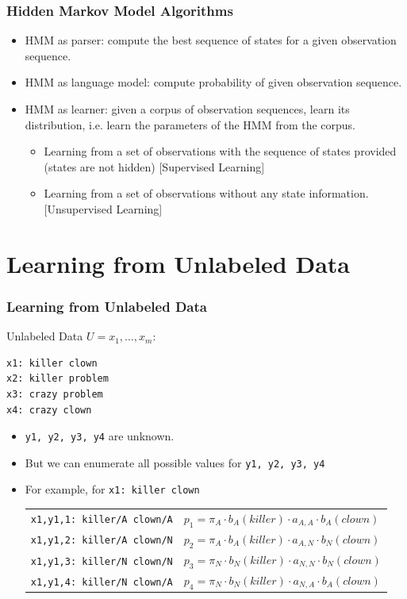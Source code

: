 \begin{frame}
\frametitle{Hidden Markov Model Algorithms}
\begin{itemize}
\item HMM as parser: compute the best sequence of states for a given observation sequence.
\item HMM as language model: compute probability of given observation sequence.
\item HMM as learner: given a corpus of observation sequences, learn its distribution, i.e. learn the parameters of the HMM from the corpus.
\begin{itemize}
\item Learning from a set of observations with the sequence of states provided (states are not hidden) {\color{blue} [Supervised Learning]}
\item Learning from a set of observations without any state information. {\color{blue} [Unsupervised Learning]}
\end{itemize}
\end{itemize}
\end{frame}

\section{Learning from Unlabeled Data}

\begin{frame}[fragile]
\frametitle{Learning from Unlabeled Data}
\begin{block}{Unlabeled Data $U = x_1, \ldots, x_m$:}
\begin{verbatim}
x1: killer clown
x2: killer problem
x3: crazy problem
x4: crazy clown
\end{verbatim}
\end{block}

\begin{itemize}[<+->]
\item {\tt y1, y2, y3, y4} are unknown.
\item But we can enumerate all possible values for {\tt y1, y2, y3, y4}
\item For example, for {\tt x1: killer clown}
{\small\begin{tabular}{ll}
\pause
{\tt x1,y1,1: killer/A clown/A} & $p_1 = \pi_A \cdot b_A(\textit{killer}) \cdot a_{A,A} \cdot b_A(\textit{clown})$ \\
\pause
{\tt x1,y1,2: killer/A clown/N} & $p_2 = \pi_A \cdot b_A(\textit{killer}) \cdot a_{A,N} \cdot b_N(\textit{clown})$\\
\pause
{\tt x1,y1,3: killer/N clown/N} & $p_3 = \pi_N \cdot b_N(\textit{killer}) \cdot a_{N,N} \cdot b_N(\textit{clown})$\\
\pause
{\tt x1,y1,4: killer/N clown/A} & $p_4 = \pi_N \cdot b_N(\textit{killer}) \cdot a_{N,A} \cdot b_A(\textit{clown})$
\end{tabular}}
\end{itemize}
\end{frame}


